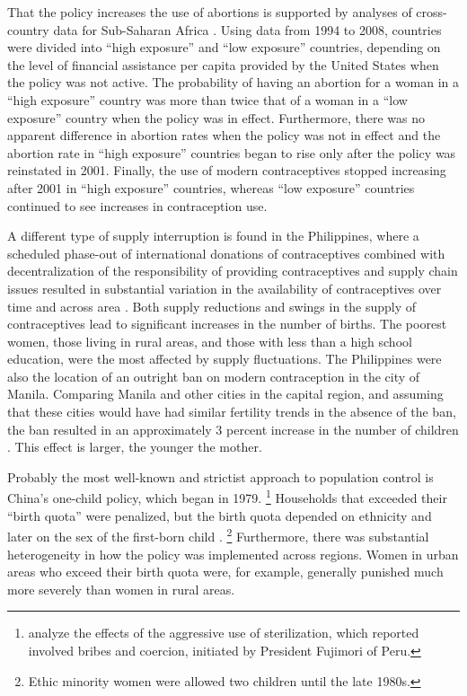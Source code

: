 \documentclass[letterpaper,12pt]{article}
\begin{document}
That the policy increases the use of abortions is supported by analyses
of cross-country data for Sub-Saharan Africa \citep{Bendavid2011}. 
Using data from 1994 to 2008, countries were divided into ``high
exposure'' and ``low exposure'' countries, depending on the level of
financial assistance per capita provided by the United States when the
policy was not active. 
The probability of having an abortion for a woman in a ``high exposure''
country was more than twice that of a woman in a ``low exposure''
country when the policy was in effect. 
Furthermore, there was no apparent difference in abortion rates when the
policy was not in effect and the abortion rate in ``high exposure''
countries began to rise only after the policy was reinstated in 2001. 
Finally, the use of modern contraceptives stopped increasing after 2001
in ``high exposure'' countries, whereas ``low exposure'' countries
continued to see increases in contraception use.

A different type of supply interruption is found in the Philippines,
where a scheduled phase-out of international donations of contraceptives
combined with decentralization of the responsibility of providing
contraceptives and supply chain issues resulted in substantial variation
in the availability of contraceptives over time and across area
\citep{Salas2014}. 
Both supply reductions and swings in the supply of contraceptives lead
to significant increases in the number of births. 
The poorest women, those living in rural areas, and those with less than
a high school education, were the most affected by supply fluctuations. 
The Philippines were also the location of an outright ban on modern
contraception in the city of Manila. 
Comparing Manila and other cities in the capital region, and assuming
that these cities would have had similar fertility trends in the absence
of the ban, the ban resulted in an approximately 3 percent increase in
the number of children \citep{Dumas2017}. 
This effect is larger, the younger the mother.

Probably the most well-known and strictist approach to population
control is China's one-child policy, which began in 1979.%
\footnote{
\citet{Byker2012} analyze the effects of the aggressive use of
sterilization, which reported involved bribes and coercion, initiated by
President Fujimori of Peru.} 
Households that exceeded their ``birth quota'' were penalized, but the
birth quota depended on ethnicity and later on the sex of the first-born
child \citep{Li2005}.%
\footnote{
Ethic minority women were allowed two children until the late 1980s.} 
Furthermore, there was substantial heterogeneity in how the policy was
implemented across regions. 
Women in urban areas who exceed their birth quota were, for example,
generally punished much more severely than women in rural areas.
\end{document}
